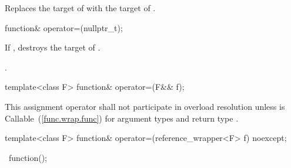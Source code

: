 \begin{itemdescr}
\pnum
\effects Replaces the target of 
with the target of .

\pnum
\returns {}
\end{itemdescr}

%
%
\begin{itemdecl}
function& operator=(nullptr_t);
\end{itemdecl}

\begin{itemdescr}
\pnum\effects If , destroys the target of .

\pnum\postconditions {}.

\pnum\returns {}
\end{itemdescr}

%
%
\begin{itemdecl}
template<class F> function& operator=(F&& f);
\end{itemdecl}

\begin{itemdescr}
\pnum\effects {}

\pnum\returns {}

\pnum\remarks This assignment operator shall not participate in overload
resolution unless  is
Callable~(\ref{func.wrap.func}) for argument types  and
return type .
\end{itemdescr}

%
%
\begin{itemdecl}
template<class F> function& operator=(reference_wrapper<F> f) noexcept;
\end{itemdecl}

\begin{itemdescr}
\pnum\effects {}

\pnum
\returns {}
\end{itemdescr}

%
\begin{itemdecl}
~function();
\end{itemdecl}

